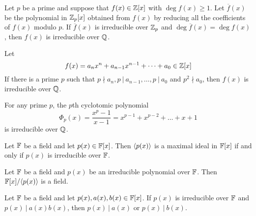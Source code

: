 
\begin{theorem}
	Let $p$ be a prime and suppose that $f(x) \in \mathbb{Z}[x]$ with $\deg f(x) \geq 1$. Let $\overline{f}(x)$ be the polynomial in $\mathbb{Z}_p[x]$ obtained from $f(x)$ by reducing all the coefficients of $f(x)$ modulo $p$. If $\overline{f}(x)$ is irreducible over $\mathbb{Z}_p$ and $\deg \overline{f}(x) = \deg f(x)$, then $f(x)$ is irreducible over $\mathbb{Q}$.
\end{theorem}

\begin{theorem}
	Let
	\[ f(x) = a_nx^n + a_{n-1}x^{n-1} + \dots + a_0 \in \mathbb{Z}[x] \]
	\noindent If there is a prime $p$ such that $p \nmid a_n, p\ \vert\ a_{n-1}, \dots, p\ \vert\ a_0$ and $p^2 \nmid a_0$, then $f(x)$ is irreducible over $\mathbb{Q}$.
\end{theorem}

\begin{corollary}
	For any prime $p$, the $p$th cyclotomic polynomial
	\[ \Phi_p(x) = \frac{x^p - 1}{x-1} = x^{p-1} + x^{p-2} + \dots + x + 1 \]
	\noindent is irreducible over $\mathbb{Q}$.
\end{corollary}

\begin{theorem}
	Let $\mathbb{F}$ be a field and let $p(x) \in \mathbb{F}[x]$. Then $\langle p(x) \rangle$ is a maximal ideal in $\mathbb{F}[x]$ if and only if $p(x)$ is irreducible over $\mathbb{F}$.
\end{theorem}

\begin{corollary}
	Let $\mathbb{F}$ be a field and $p(x)$ be an irreducible polynomial over $\mathbb{F}$. Then $\mathbb{F}[x]/\langle p(x) \rangle$ is a field.
\end{corollary}

\begin{corollary}
	Let $\mathbb{F}$ be a field and let $p(x), a(x), b(x) \in \mathbb{F}[x]$. If $p(x)$ is irreducible over $\mathbb{F}$ and $p(x)\ \vert\ a(x)b(x)$, then $p(x)\ \vert\ a(x)$ or $p(x)\ \vert\ b(x)$.
\end{corollary}
